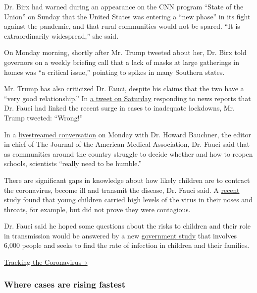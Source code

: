 Dr. Birx had warned during an appearance on the CNN program ``State of
the Union'' on Sunday that the United States was entering a ``new
phase'' in its fight against the pandemic, and that rural communities
would not be spared. ``It is extraordinarily widespread,'' she said.

On Monday morning, shortly after Mr. Trump tweeted about her, Dr. Birx
told governors on a weekly briefing call that a lack of masks at large
gatherings in homes was ``a critical issue,'' pointing to spikes in many
Southern states.

Mr. Trump has also criticized Dr. Fauci, despite his claims that the two
have a ``very good relationship.'' In
\href{https://twitter.com/realDonaldTrump/status/1289633359681839105}{a
tweet on Saturday} responding to news reports that Dr. Fauci had linked
the recent surge in cases to inadequate lockdowns, Mr. Trump tweeted:
``Wrong!''

In a
\href{https://www.youtube.com/watch?v=8PgmAWgiL1A\&feature=youtu.be}{livestreamed
conversation} on Monday with Dr. Howard Bauchner, the editor in chief of
The Journal of the American Medical Association, Dr. Fauci said that as
communities around the country struggle to decide whether and how to
reopen schools, scientists ``really need to be humble.''

There are significant gaps in knowledge about how likely children are to
contract the coronavirus, become ill and transmit the disease, Dr. Fauci
said. A
\href{https://www.nytimes3xbfgragh.onion/2020/07/30/health/coronavirus-children.html?searchResultPosition=1}{recent
study} found that young children carried high levels of the virus in
their noses and throats, for example, but did not prove they were
contagious.

Dr. Fauci said he hoped some questions about the risks to children and
their role in transmission would be answered by a new
\href{https://www.nih.gov/news-events/news-releases/study-determine-incidence-novel-coronavirus-infection-us-children-begins}{government
study} that involves 6,000 people and seeks to find the rate of
infection in children and their families.

\href{https://www.nytimes3xbfgragh.onion/interactive/2020/us/coronavirus-us-cases.html}{Tracking
the Coronavirus~›}

\href{https://www.nytimes3xbfgragh.onion/interactive/2020/us/coronavirus-us-cases.html}{}

\hypertarget{where-cases-are-rising-fastest}{%
\subsubsection{\texorpdfstring{Where cases are \textbf{rising}
fastest}{Where cases are rising fastest}}\label{where-cases-are-rising-fastest}}

